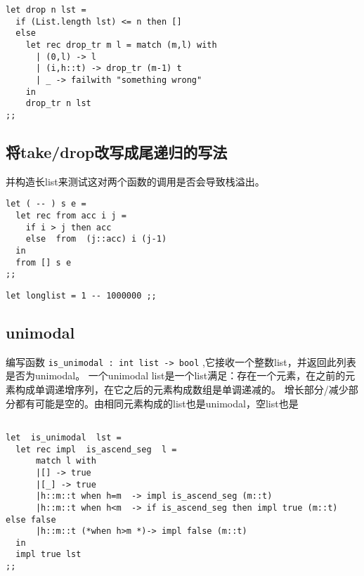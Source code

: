 \documentclass[11pt]{article}
\begin{document}
\begin{verbatim}
let drop n lst =
  if (List.length lst) <= n then []
  else
    let rec drop_tr m l = match (m,l) with
      | (0,l) -> l
      | (i,h::t) -> drop_tr (m-1) t
      | _ -> failwith "something wrong"
    in
    drop_tr n lst
;;

\end{verbatim}

\subsection{将take/drop改写成尾递归的写法}
\label{sec:org4aadd2f}
并构造长list来测试这对两个函数的调用是否会导致栈溢出。

\begin{verbatim}
let ( -- ) s e = 
  let rec from acc i j =
    if i > j then acc
    else  from  (j::acc) i (j-1)
  in
  from [] s e
;;
\end{verbatim}

\begin{verbatim}
let longlist = 1 -- 1000000 ;; 
\end{verbatim}


\subsection{unimodal}
\label{sec:org63968de}
编写函数 \texttt{is\_unimodal : int list -> bool} ,它接收一个整数list，并返回此列表是否为unimodal。
一个unimodal list是一个list满足：存在一个元素，在之前的元素构成单调递增序列，在它之后的元素构成数组是单调递减的。
增长部分/减少部分都有可能是空的。由相同元素构成的list也是unimodal，空list也是

\begin{verbatim}

let  is_unimodal  lst =
  let rec impl  is_ascend_seg  l =
      match l with
      |[] -> true
      |[_] -> true
      |h::m::t when h=m  -> impl is_ascend_seg (m::t)  
      |h::m::t when h<m  -> if is_ascend_seg then impl true (m::t) else false
      |h::m::t (*when h>m *)-> impl false (m::t)
  in
  impl true lst
;;
\end{verbatim}
\end{document}
